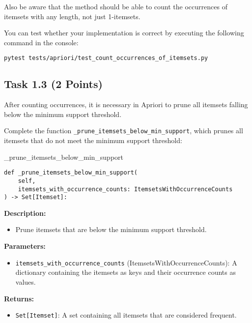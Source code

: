 \documentclass[
english,
smallborders
]{i6prcsht}
\newcommand{\points}[1]{\hfill \color{red}(#1 Points)\color{black}}
\begin{document}
Also be aware that the method should be able to count the occurrences of itemsets with any length, not just 1-itemsets.

You can test whether your implementation is correct by executing the following command in the console:

\vspace*{0.3cm}

\begin{lstlisting}
pytest tests/apriori/test_count_occurrences_of_itemsets.py
\end{lstlisting}

\newpage

\subsection*{Task 1.3 \points{2}}

After counting occurrences, it is necessary in Apriori to prune all itemsets falling below the minimum support threshold.

Complete the function \texttt{\_prune\_itemsets\_below\_min\_support}, which prunes all itemsets that do not meet the minimum support threshold:

\vspace*{0.3cm}

\begin{functionbox}{\_prune\_itemsets\_below\_min\_support}
	\begin{lstlisting}[numbers=none]
def _prune_itemsets_below_min_support(
    self,
    itemsets_with_occurrence_counts: ItemsetsWithOccurrenceCounts
) -> Set[Itemset]:
\end{lstlisting}
	
	\textbf{Description:}
	\begin{itemize}[leftmargin=*,topsep=0pt]
		\item Prune itemsets that are below the minimum support threshold.
	\end{itemize}
	
	\textbf{Parameters:}
	\begin{itemize}[leftmargin=*,topsep=0pt]
		\item \texttt{itemsets\_with\_occurrence\_counts} (ItemsetsWithOccurrenceCounts): A dictionary containing the itemsets as keys and their occurrence counts as values.
	\end{itemize}
	
	\textbf{Returns:}
	\begin{itemize}[leftmargin=*,topsep=0pt]
		\item \texttt{Set[Itemset]}: A set containing all itemsets that are considered frequent.
	\end{itemize}
\end{functionbox}
\end{document}
